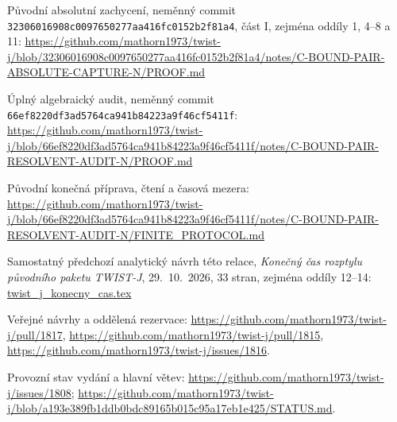 \documentclass[11pt,a4paper]{article}
\theoremstyle{remark}\newtheorem{remark}[theorem]{Poznámka}
\numberwithin{equation}{section}
\begin{document}
\begin{description}[leftmargin=9mm,style=nextline]
\item[S1] Původní absolutní zachycení, neměnný
commit \nolinkurl{32306016908c0097650277aa416fc0152b2f81a4},
část I, zejména oddíly 1, 4--8 a 11:
\url{https://github.com/mathorn1973/twist-j/blob/32306016908c0097650277aa416fc0152b2f81a4/notes/C-BOUND-PAIR-ABSOLUTE-CAPTURE-N/PROOF.md}
\item[S2] Úplný algebraický audit, neměnný
commit \nolinkurl{66ef8220df3ad5764ca941b84223a9f46cf5411f}:
\url{https://github.com/mathorn1973/twist-j/blob/66ef8220df3ad5764ca941b84223a9f46cf5411f/notes/C-BOUND-PAIR-RESOLVENT-AUDIT-N/PROOF.md}
\item[S3] Původní konečná příprava, čtení a časová mezera:
\url{https://github.com/mathorn1973/twist-j/blob/66ef8220df3ad5764ca941b84223a9f46cf5411f/notes/C-BOUND-PAIR-RESOLVENT-AUDIT-N/FINITE_PROTOCOL.md}
\item[S4] Samostatný předchozí analytický návrh této relace,
\textit{Konečný čas rozptylu původního paketu TWIST-J},
29.~10.~2026, 33 stran, zejména oddíly 12--14:
\url{twist_j_konecny_cas.tex}
\item[S5] Veřejné návrhy a oddělená rezervace:
\url{https://github.com/mathorn1973/twist-j/pull/1817},
\url{https://github.com/mathorn1973/twist-j/pull/1815},
\url{https://github.com/mathorn1973/twist-j/issues/1816}.
\item[S6] Provozní stav vydání a hlavní větev:
\url{https://github.com/mathorn1973/twist-j/issues/1808};
\url{https://github.com/mathorn1973/twist-j/blob/a193e389fb1ddb0bdc89165b015c95a17eb1e425/STATUS.md}.
\end{description}
\end{document}
